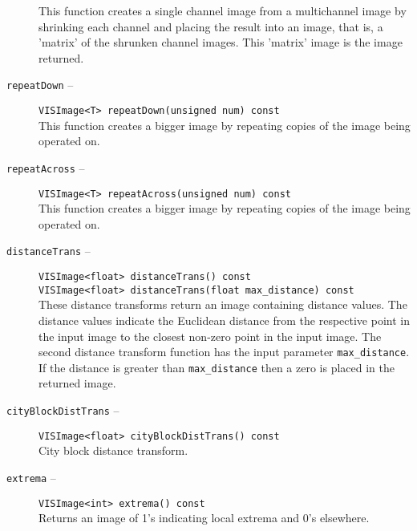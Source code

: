 \begin{description}
This function creates a single channel image from a multichannel image
by shrinking each channel and placing the result into an image,
that is, a 'matrix' of the shrunken channel images.
This 'matrix' image is the image returned.
\item[{\tt repeatDown} --]
{\tt VISImage<T> repeatDown(unsigned num) const}\\
This function creates a bigger image by repeating
copies of the image being operated on.
\item[{\tt repeatAcross} --]
{\tt VISImage<T> repeatAcross(unsigned num) const}\\
This function creates a bigger image by repeating
copies of the image being operated on.
\item[{\tt distanceTrans} --]
{\tt VISImage<float> distanceTrans() const}\\
{\tt VISImage<float> distanceTrans(float max\_distance) const}\\
These distance transforms return an image containing distance values.
The distance values indicate the Euclidean distance
from the respective point in the input image to the closest non-zero
point in the input image.
The second distance transform function has the input parameter
{\tt max\_distance}.  If the distance is greater than {\tt max\_distance}
then a zero is placed in the returned image.
\item[{\tt cityBlockDistTrans} --]
{\tt VISImage<float> cityBlockDistTrans() const}\\
City block distance transform.
\item[{\tt extrema} --]
{\tt VISImage<int> extrema() const}\\
Returns an image of 1's indicating local extrema and 0's elsewhere.
\end{description}


